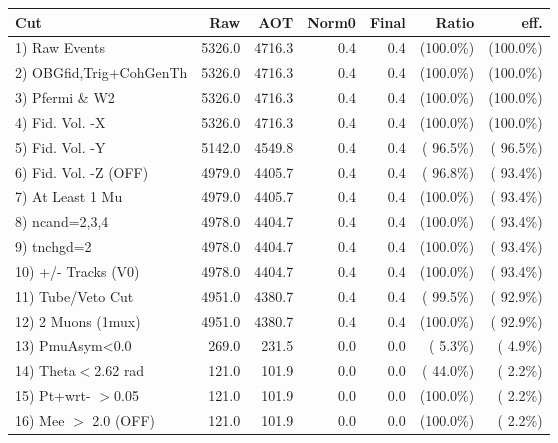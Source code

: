  \begin{table}[h!]\centering
 \begin{tabular}{||l||r|r|r|r|r|r||}
 \hline
 \hline
 Cut & Raw & AOT & Norm0 & Final & Ratio & eff.       \\
 \hline
  1) Raw Events           &       5326.0 &       4716.3 &          0.4 &          0.4 & (100.0\%) & (100.0\%) \\
  2) OBGfid,Trig+CohGenTh &       5326.0 &       4716.3 &          0.4 &          0.4 & (100.0\%) & (100.0\%) \\
  3) Pfermi \& W2         &       5326.0 &       4716.3 &          0.4 &          0.4 & (100.0\%) & (100.0\%) \\
  4) Fid. Vol. -X         &       5326.0 &       4716.3 &          0.4 &          0.4 & (100.0\%) & (100.0\%) \\
  5) Fid. Vol. -Y         &       5142.0 &       4549.8 &          0.4 &          0.4 & ( 96.5\%) & ( 96.5\%) \\
  6) Fid. Vol. -Z (OFF)   &       4979.0 &       4405.7 &          0.4 &          0.4 & ( 96.8\%) & ( 93.4\%) \\
  7) At Least 1 Mu        &       4979.0 &       4405.7 &          0.4 &          0.4 & (100.0\%) & ( 93.4\%) \\
  8) ncand=2,3,4          &       4978.0 &       4404.7 &          0.4 &          0.4 & (100.0\%) & ( 93.4\%) \\
  9) tnchgd=2             &       4978.0 &       4404.7 &          0.4 &          0.4 & (100.0\%) & ( 93.4\%) \\
 10) +/- Tracks (V0)      &       4978.0 &       4404.7 &          0.4 &          0.4 & (100.0\%) & ( 93.4\%) \\
 11) Tube/Veto Cut        &       4951.0 &       4380.7 &          0.4 &          0.4 & ( 99.5\%) & ( 92.9\%) \\
 12) 2 Muons (1mux)       &       4951.0 &       4380.7 &          0.4 &          0.4 & (100.0\%) & ( 92.9\%) \\
 13) PmuAsym<0.0          &        269.0 &        231.5 &          0.0 &          0.0 & (  5.3\%) & (  4.9\%) \\
 14) Theta$<$2.62 rad     &        121.0 &        101.9 &          0.0 &          0.0 & ( 44.0\%) & (  2.2\%) \\
 15) Pt+wrt- $>$0.05      &        121.0 &        101.9 &          0.0 &          0.0 & (100.0\%) & (  2.2\%) \\
 16) Mee $>$ 2.0  (OFF)   &        121.0 &        101.9 &          0.0 &          0.0 & (100.0\%) & (  2.2\%) \\

\end{tabular}
\end{table}
